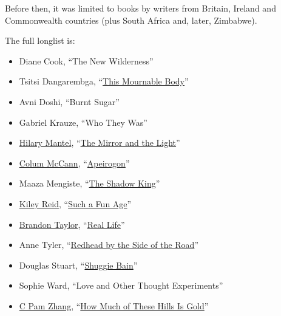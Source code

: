 Before then, it was limited to books by writers from Britain, Ireland
and Commonwealth countries (plus South Africa and, later, Zimbabwe).

The full longlist is:

\begin{itemize}
\item
  Diane Cook, ``The New Wilderness''
\item
  Tsitsi Dangarembga,
  ``\href{https://www.nytimes3xbfgragh.onion/2018/08/30/books/review/tsitsi-dangarembga-this-mournable-body.html?searchResultPosition=1}{This
  Mournable Body}''
\item
  Avni Doshi, ``Burnt Sugar''
\item
  Gabriel Krauze, ``Who They Was''
\item
  \href{https://www.nytimes3xbfgragh.onion/2020/02/24/books/hilary-mantel-mirror-and-the-light-thomas-cromwell.html}{Hilary
  Mantel},
  ``\href{https://www.nytimes3xbfgragh.onion/2020/03/03/books/review-mirror-light-hilary-mantel.html}{The
  Mirror and the Light}''
\item
  \href{https://www.nytimes3xbfgragh.onion/2020/02/17/books/colum-mccann-apeirogon-israel-palestine.html}{Colum
  McCann},
  ``\href{https://www.nytimes3xbfgragh.onion/2020/02/19/books/review-apeirogon-colum-mccann.html}{Apeirogon}''
\item
  Maaza Mengiste,
  ``\href{https://www.nytimes3xbfgragh.onion/2019/09/26/books/review/maaza-mengiste-the-shadow-king.html}{The
  Shadow King}''
\item
  \href{https://www.nytimes3xbfgragh.onion/2020/01/09/books/review/inside-the-list-kiley-reid.html}{Kiley
  Reid},
  ``\href{https://www.nytimes3xbfgragh.onion/2019/12/31/books/review/such-a-fun-age-kiley-reid.html}{Such
  a Fun Age}''
\item
  \href{https://www.nytimes3xbfgragh.onion/2020/02/10/books/brandon-taylor-real-life.html}{Brandon
  Taylor},
  ``\href{https://www.nytimes3xbfgragh.onion/2020/02/18/books/review/brandon-taylor-real-life.html}{Real
  Life}''
\item
  Anne Tyler,
  ``\href{https://www.nytimes3xbfgragh.onion/2020/04/07/books/review/redhead-by-the-side-of-the-road-anne-tyler.html}{Redhead
  by the Side of the Road}''
\item
  Douglas Stuart,
  ``\href{https://www.nytimes3xbfgragh.onion/2020/02/11/books/review/shuggie-bain-douglas-stuart.html}{Shuggie
  Bain}''
\item
  Sophie Ward, ``Love and Other Thought Experiments''
\item
  \href{https://www.nytimes3xbfgragh.onion/2020/04/04/books/c-pam-zhang-how-much-of-these-hills-is-gold.html}{C
  Pam Zhang},
  ``\href{https://www.nytimes3xbfgragh.onion/2020/04/07/books/review/how-much-of-these-hills-is-gold-c-pam-zhang.html}{How
  Much of These Hills Is Gold}''
\end{itemize}

